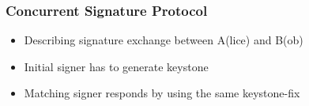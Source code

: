 \begin{frame}
	\frametitle{Concurrent Signature Protocol}

	\begin{itemize}
		\setlength\itemsep{1em}
		\item Describing signature exchange between A(lice) and B(ob)
		\item Initial signer has to generate keystone
		\item Matching signer responds by using the same keystone-fix
	\end{itemize}
\end{frame}





